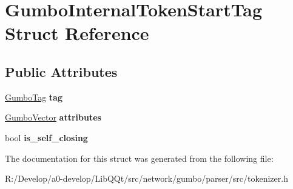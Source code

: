 \hypertarget{struct_gumbo_internal_token_start_tag}{}\section{Gumbo\+Internal\+Token\+Start\+Tag Struct Reference}
\label{struct_gumbo_internal_token_start_tag}
\subsection*{Public Attributes}
\begin{DoxyCompactItemize}
\item 
\mbox{\label{struct_gumbo_internal_token_start_tag_a4ff5d6f0351dcd97bd63430be5884c01}} 
\mbox{\hyperlink{gumbo_8h_a5a3aa6f4b039f85875d638088e676a0f}{Gumbo\+Tag}} {\bfseries tag}
\item 
\mbox{\label{struct_gumbo_internal_token_start_tag_a4500bd9b7a0204daca8c41c7be94e6af}} 
\mbox{\hyperlink{struct_gumbo_vector}{Gumbo\+Vector}} {\bfseries attributes}
\item 
\mbox{\label{struct_gumbo_internal_token_start_tag_acaa56aebacd0e51e36db8113a5bcf7f0}} 
bool {\bfseries is\+\_\+self\+\_\+closing}
\end{DoxyCompactItemize}


The documentation for this struct was generated from the following file\+:\begin{DoxyCompactItemize}
\item 
R\+:/\+Develop/a0-\/develop/\+Lib\+Q\+Qt/src/network/gumbo/parser/src/tokenizer.\+h\end{DoxyCompactItemize}
